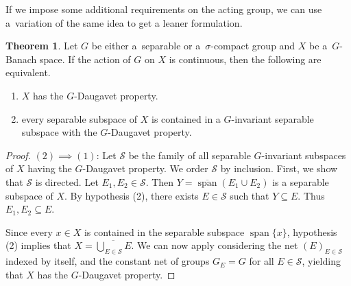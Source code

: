 \documentclass[a4paper,12pt]{amsart}
\theoremstyle{definition}
\newtheorem{theorem}{Theorem}[section]
\theoremstyle{definition}
\theoremstyle{remark}
\numberwithin{equation}{section}
\newcommand{\<}{\langle}
\renewcommand{\>}{\rangle}
\newcommand{\spann}{\operatorname{span}}
\newcommand{\clspan}{\overline{\operatorname{span}}}
\begin{document}
	
	If we impose some additional requirements on the acting group, we can use a~variation of the same idea to get a leaner formulation.
	\begin{theorem}
		Let $G$ be either a~separable or a~$\sigma$-compact group and $X$ be a~$G$-Banach space. If the action of $G$ on $X$ is continuous, then the following are equivalent.
		\begin{enumerate}
			\item $X$ has the $G$-Daugavet property.
			\item every separable subspace of $X$ is contained in a $G$-invariant separable subspace with the $G$-Daugavet property.
		\end{enumerate}
	\end{theorem}
	\begin{proof}
		$(2) \implies (1)$:
		Let $\mathcal{S}$ be the family of all separable $G$-invariant subspaces of $X$ having the $G$-Daugavet property. We order $\mathcal{S}$ by inclusion.
		First, we show that $\mathcal{S}$ is directed. Let $E_1, E_2 \in \mathcal{S}$. Then $Y = \clspan(E_1 \cup E_2)$ is a separable subspace of $X$. By hypothesis (2), there exists $E \in \mathcal{S}$ such that $Y \subseteq E$. Thus $E_1, E_2 \subseteq E$.
		
		Since every $x \in X$ is contained in the separable subspace $\spann\{x\}$, hypothesis (2) implies that $X = \overline{\bigcup_{E \in \mathcal{S}} E}$.
		We can now apply  considering the net $(E)_{E \in \mathcal{S}}$ indexed by itself, and the constant net of groups $G_E = G$ for all $E \in \mathcal{S}$, yielding that $X$ has the $G$-Daugavet property.
		
		
		

\end{proof}
\end{document}
